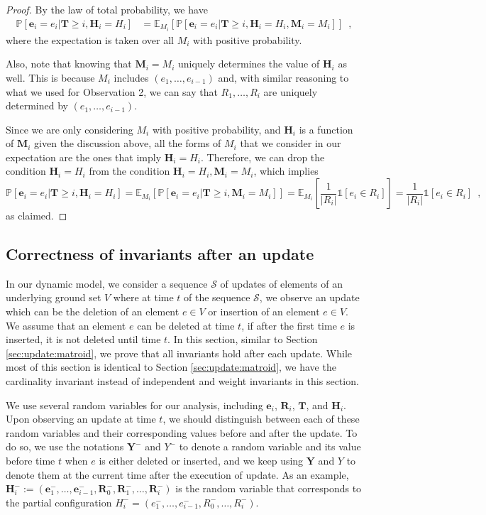 \documentclass[11pt]{article}
\renewcommand{\Pr}[1]{\ensuremath{\mathbb{P}\left[#1\right]}}
\newcommand{\Exu}[2]{\ensuremath{\mathbb{E}_{#1}\left[#2\right]}}
\newcommand{\ind}[1]{\ensuremath{\mathds{1}\left[#1\right]}}
\newcommand{\bR}{\ensuremath{\mathbf{R}}}
\newcommand{\bE}{\ensuremath{\mathbf{e}}}
\newcommand{\bT}{\ensuremath{\mathbf{T}}}
\newcommand{\bM}{\ensuremath{\mathbf{M}}}
\newcommand{\bH}{\ensuremath{\mathbf{H}}}
\newcommand{\bY}{\ensuremath{\mathbf{Y}}}
\begin{document}
\begin{proof}
    By the law of total probability, we have 
    \begin{align*}
        \Pr{\bE_i = e_i | 
        \bT \ge i,
        \bH_i = H_i
        }
        &=
        \Exu{M_i}{
        \Pr{\bE_i = e_i | 
        \bT \ge i,
        \bH_i = H_i,
        \bM_i=M_i
        }
        } \enspace , 
    \end{align*}
    where the expectation is taken over all $M_i$ with positive probability.

    Also, note that knowing that $\bM_i = M_i$ uniquely determines the value of $\bH_i$ as well. This is because $M_i$ includes $(e_1, \dots, e_{i-1})$ and, with similar reasoning to what we used for Observation 2, we can say that $R_1, \dots, R_{i}$ are uniquely determined by $(e_1, \dots, e_{i-1})$.
    
Since we are only considering $M_i$ with positive probability, and $\bH_i$ is a function of $\bM_i$ given the discussion above, all the forms of $M_i$ that we consider in our expectation are the ones that imply $\bH_i = H_i$. Therefore, we can drop the condition $\bH_i=H_i$ from the condition $\bH_i=H_i, \bM_i = M_i$, which implies
\[
        \Pr{\bE_i = e_i | \bT \ge i, \bH_i = H_i }
        = \Exu{M_i}{ \Pr{\bE_i = e_i | \bT \ge i, \bM_i=M_i} }
        = \Exu{M_i}{ \frac{1}{|R_i|} \ind{e_i \in R_i} }
        =\frac{1}{|R_i|} \ind{e_i \in R_i} \enspace ,
\]
    as claimed.
\end{proof}



\subsection{Correctness of invariants after an update}
In our dynamic model, 
we consider a sequence $\mathcal{S}$ of updates of elements of an underlying ground set $V$ 
where at time $t$ of the sequence $\mathcal{S}$, we observe an update which can be the deletion of an element $e \in V$ or insertion of an element $e \in V$. 
We assume that an element $e$ can be deleted at time $t$, if after the first time $e$ is inserted, it is not deleted until time $t$. 
In this section, similar to Section \ref{sec:update:matroid}, we prove that all invariants hold after each update.
While most of this section is identical to Section \ref{sec:update:matroid}, we have the cardinality invariant instead of independent and weight invariants in this section.


We use several random variables for our analysis, including $\bE_i$, $\bR_i$, $\bT$, and $\bH_i$. Upon observing an update at time $t$, 
we should distinguish between each of these random variables and their corresponding values before and after the update.
To do so, we use the notations $\bY^-$ and $Y^{-}$ to denote a random variable and its value before time $t$ when $e$ is either deleted or inserted, and we keep using $\bY$ and $Y$ to denote them at the current time after the execution of update.
As an example,
    $\bH_i^- := (\bE_1^-, \dots, \bE_{i-1}^-, \bR_0^-,  \bR_{1}^-, \dots, \bR_{i}^-)$ 
    is the random variable that corresponds to the partial configuration $H_i^- = (e_1^-, \dots, e_{i-1}^-, R_0^-, \dots, R_{i}^-)$.
\end{document}
